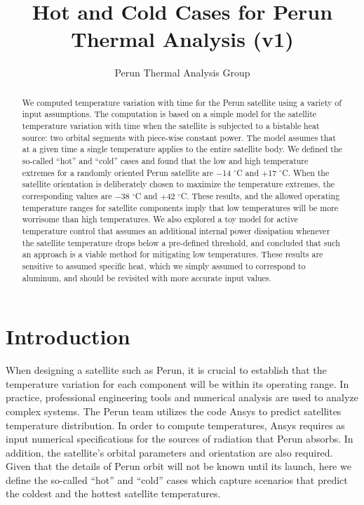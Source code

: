\documentclass[]{aastex62}
\begin{document}
\title{Hot and Cold Cases for Perun Thermal Analysis (v1)}  
 

\author{Perun Thermal Analysis Group}

\begin{abstract}
We computed temperature variation with time for the Perun satellite using a variety of input
assumptions. The computation is based on a simple model for the satellite temperature variation 
with time when the satellite is subjected to a bistable heat source: two orbital segments with 
piece-wise constant power. The model assumes that at a given time a single temperature applies 
to the entire satellite body. 
We defined the so-called ``hot'' and ``cold'' cases and found that the low and high temperature 
extremes for a randomly oriented Perun satellite are $-$14 $^\circ$C and $+$17 $^\circ$C. When the 
satellite orientation is deliberately chosen to maximize the temperature extremes, the corresponding 
values are $-$38 $^\circ$C and $+$42 $^\circ$C. These results, and the allowed operating temperature
ranges for satellite components imply that low temperatures will be more worrisome than high
temperatures. We also explored a toy model for active temperature control that assumes an additional
internal power dissipation whenever the satellite temperature drops below a pre-defined threshold,
and concluded that such an approach is a viable method for mitigating low temperatures.
These results are sensitive to assumed specific heat, which we simply assumed to correspond to 
aluminum, and should be revisited with more accurate input values. 
\end{abstract}



\section{Introduction}
 
When designing a satellite such as Perun, it is crucial to establish that the temperature variation for 
each component will be within its operating range. In practice, professional engineering tools and 
numerical analysis are used to analyze complex systems. The Perun team utilizes the code Ansys
to predict satellites temperature distribution. In order to compute temperatures, Ansys requires
as input numerical specifications for the sources of radiation that Perun absorbs. In addition, 
the satellite's orbital parameters and orientation are also required. Given that the details of 
Perun orbit will not be known until its launch, here we define the so-called ``hot'' and ``cold'' 
cases which capture scenarios that predict the coldest and the hottest satellite temperatures. 
 
\end{document}

